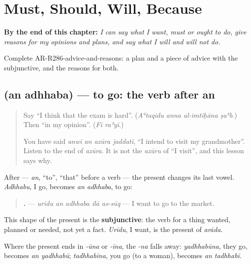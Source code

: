 
\chapter{Must, Should, Will, Because}
\label{ch:ar-must-should-will-because}

\begin{chapteropening}
\textbf{By the end of this chapter:} \emph{I can say what I want, must or ought to do, give reasons for my opinions and plans, and say what I will and will not do.}

Complete AR-R286-advice-and-reasons: a plan and a piece of advice with the subjunctive, and the reasons for both.
\end{chapteropening}

\section[\texorpdfstring{\ar{أن} \ar{أذهب} (an adhhaba)}{أن أذهب (an adhhaba)}]{  (an adhhaba) — to go: the verb after an}

\label{lesson:AR-C286-an-adhhaba}



\begin{quote}
Say \textquotedblleft{}I think that the exam is hard\textquotedblright{}. (\emph{Aʿtaqidu anna al-imtiḥāna ṣaʿb}.) Then \textquotedblleft{}in my opinion\textquotedblright{}. (\emph{Fī raʾyī}.)

You have said \emph{anwī an azūra jaddatī}, \textquotedblleft{}I intend to visit my grandmother\textquotedblright{}. Listen to the end of \emph{azūra}. It is not the \emph{azūru} of \textquotedblleft{}I visit\textquotedblright{}, and this lesson says why.
\end{quote}

\begin{grammarlens}[title={Grammar Lens: -u becomes -a}]
After \textbf{} — \emph{an}, \textquotedblleft{}to\textquotedblright{}, \textquotedblleft{}that\textquotedblright{} before a verb — the present changes its last vowel. \emph{Adhhabu}, I go, becomes \emph{an adhhaba}, to go:

\begin{quote}
\textbf{    .} — \emph{urīdu an adhhaba ilā as-sūq} — I want to go to the market.
\end{quote}

This shape of the present is the \textbf{subjunctive}: the verb for a thing wanted, planned or needed, not yet a fact. \emph{Urīdu}, I want, is the present of \emph{arāda}.

Where the present ends in \emph{-ūna} or \emph{-īna}, the \emph{-na} falls away: \emph{yadhhabūna}, they go, becomes \emph{an yadhhabū}; \emph{tadhhabīna}, you go (to a woman), becomes \emph{an tadhhabī}.
\end{grammarlens}

